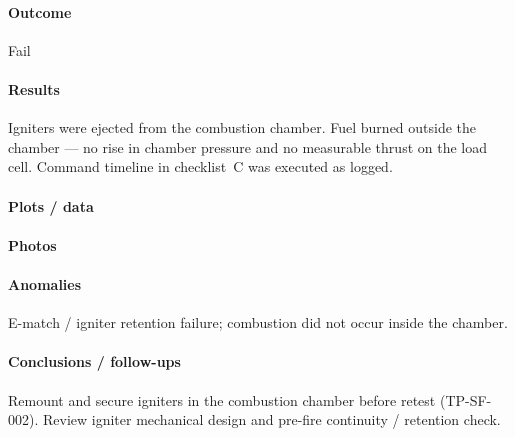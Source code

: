 \paragraph{Outcome}
Fail

\paragraph{Results}
Igniters were ejected from the combustion chamber. Fuel burned outside the
chamber --- no rise in chamber pressure and no measurable thrust on the load
cell. Command timeline in checklist~C was executed as logged.

\paragraph{Plots / data}

\paragraph{Photos}

\paragraph{Anomalies}
E-match / igniter retention failure; combustion did not occur inside the chamber.

\paragraph{Conclusions / follow-ups}
Remount and secure igniters in the combustion chamber before retest (TP-SF-002).
Review igniter mechanical design and pre-fire continuity / retention check.
